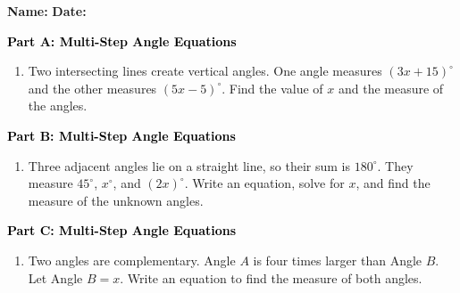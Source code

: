 \documentclass[12pt, letterpaper, fleqn]{article}
\begin{document}
\textbf{Name:} \underline{\hspace{5cm}}
\hfill
\textbf{Date:} \underline{\hspace{3cm}}\\

\begin{tcolorbox}[colback=customteal!20]
\large\textcolor{black}{\textbf{Part A: Multi-Step Angle Equations}}
\end{tcolorbox}

\vspace{3mm}

\begin{enumerate}[itemsep=4.2cm, leftmargin=0.6cm]
\item Two intersecting lines create vertical angles. One angle measures $(3x + 15)^\circ$ and the other measures $(5x - 5)^\circ$. Find the value of $x$ and the measure of the angles.
\end{enumerate}

\newpage

\begin{tcolorbox}[colback=customteal!20]
\large\textcolor{black}{\textbf{Part B: Multi-Step Angle Equations}}
\end{tcolorbox}

\vspace{3mm}

\begin{enumerate}[itemsep=4.2cm, leftmargin=0.6cm, resume]
\item Three adjacent angles lie on a straight line, so their sum is $180^\circ$. They measure $45^\circ$, $x^\circ$, and $(2x)^\circ$. Write an equation, solve for $x$, and find the measure of the unknown angles.
\end{enumerate}

\newpage

\begin{tcolorbox}[colback=customteal!20]
\large\textcolor{black}{\textbf{Part C: Multi-Step Angle Equations}}
\end{tcolorbox}

\vspace{3mm}

\begin{enumerate}[itemsep=4.2cm, leftmargin=0.6cm, resume]
\item Two angles are complementary. Angle $A$ is four times larger than Angle $B$. Let Angle $B = x$. Write an equation to find the measure of both angles.
\end{enumerate}
\end{document}
